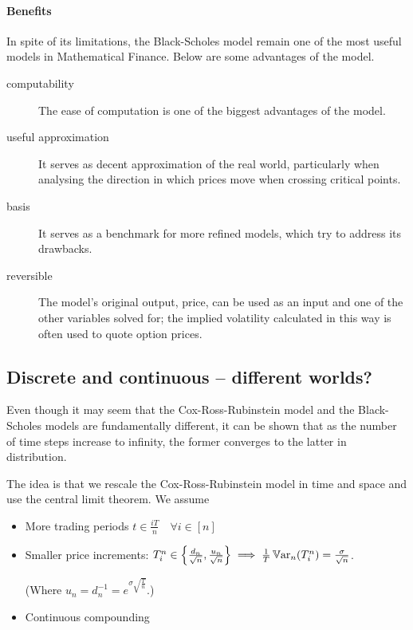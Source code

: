 \paragraph{Benefits}
In spite of its limitations, the Black-Scholes model remain one of the most useful models in Mathematical Finance. Below are some advantages of the model.
\begin{description}
	\item[computability] The ease of computation is one of the biggest advantages of the model.
	\item[useful approximation] It serves as decent approximation of the real world, particularly when analysing the direction in which prices move when crossing critical points.
	\item[basis] It serves as a benchmark for more refined models, which try to address its drawbacks.
	\item[reversible] The model's original output, price, can be used as an input and one of the other variables solved for; the implied volatility calculated in this way is often used to quote option prices.
\end{description}



\subsection{Discrete and continuous -- different worlds?}
\label{subsec:discrete-to-continuous}
Even though it may seem that the Cox-Ross-Rubinstein model and the Black-Scholes models are fundamentally different, it can be shown that as the number of time steps increase to infinity, the former converges to the latter in distribution.

The idea is that we rescale the Cox-Ross-Rubinstein model in time and space and use the central limit theorem. We assume
\begin{itemize}
	\item More trading periods $ t \in \frac{iT}{n} \quad \forall i \in [n] $
	\item Smaller price increments: $ T_i^n \in \left\lbrace \frac{d_n}{\sqrt{n}}, \frac{u_n}{\sqrt{n}} \right\rbrace  \implies  \frac{1}{T} \operatorname{\mathbb{V}\mathrm{ar}}_n (T_i^n) = \frac{\sigma}{\sqrt{n}} $.
	
	(Where $ u_n = d_n^{-1} = e^{\sigma \sqrt{\frac{T}{n}}} $.)
	
	\item Continuous compounding
\end{itemize}

